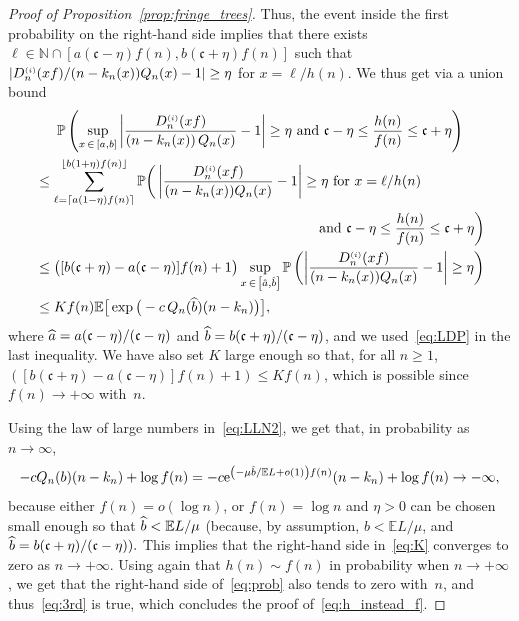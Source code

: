 \documentclass[10pt]{amsart}
\theoremstyle{definition}\newtheorem{defi}[theo]{Definition}\newtheorem{rema}[theo]{Remark}\newtheorem{exam}[theo]{Example}\newtheorem{exem}[theo]{Example}\newtheorem{nota}[theo]{Notation}
\newcommand{\sss}{\ensuremath{\scriptscriptstyle}}
\newcommand{\bbP}{\mathbb{P}}
\newcommand{\bbE}{\mathbb{E}}
\newcommand{\bbN}{\mathbb{N}}
\newcommand{\rme}{\mathrm{e}}
\newcommand{\frkc}{\mathfrak{c}}
\let\oldhat\hat
\renewcommand*{\hat}[1]{\mathchoice{\widehat{#1}}{\widehat{#1}}{\oldhat{#1}}{\oldhat{#1}}}
\begin{document}
\begin{proof}[Proof of Proposition~\ref{prop:fringe_trees}]
Thus, the event inside the first probability on the right-hand side implies that there exists $\ell\in\bbN\cap[a(\frkc-\eta)f(n), b(\frkc+\eta)f(n)]$ such that $|{D_n^{\sss (i)}(xf)}/{(n-k_n(x))Q_n(x)}-1|\geq \eta$ for $x = \ell/h(n)$. We thus get via a union bound
\begin{multline}\label{eq:K}
\bbP\left(\sup_{x\,\in\,[a,b]}\left|\frac{D_n^{\sss (i)}(xf)}{\left(n-k_n(x)\right)Q_n(x)}-1\right|\geq\eta
\text{ and } \frkc-\eta \leq \frac{h(n)}{f(n)}\leq \frkc+\eta\right)\\
\begin{aligned}
&\leq \sum_{\ell=\left\lceil a(1-\eta)f(n)\right\rceil}^{\left\lfloor b(1+\eta)f(n)\right\rfloor}
\bbP\bigg(\left|\frac{D_n^{\sss (i)}(xf)}{(n-k_n(x))Q_n(x)}-1\right|\geq\eta
\text{ for } x=\ell/h(n)\\
&\hskip20em\text{ and } \frkc-\eta \leq \frac{h(n)}{f(n)}\leq \frkc+\eta\bigg)\\
&\leq \big([b(\frkc+\eta)-a(\frkc-\eta)]f(n)+1\big)
\sup_{x\,\in\,\left[\hat a, \hat b\right]} \bbP\left(\left|\frac{D_n^{\sss (i)}(xf)}{(n-k_n(x))Q_n(x)}-1\right|\geq \eta\right)\\
&\leq Kf(n)\bbE\big[\exp\big(-c\,Q_n(\hat b)(n-k_n)\big)\big],
\end{aligned}
\end{multline}
where $\hat a = a(\frkc-\eta)/(\frkc-\eta)$ and $\hat b = b(\frkc+\eta)/(\frkc-\eta)$, and we used~\eqref{eq:LDP} in the last inequality. We have also set $K$ large enough so that, for all $n\geq 1$, $([b(\frkc+\eta)-a(\frkc-\eta)]f(n)+1)\leq Kf(n)$, which is possible since $f(n)\to+\infty$ with~$n$.


Using the law of large numbers in~\eqref{eq:LLN2}, we get that, in probability as $n\to\infty$,
\[
-cQ_n(b)(n-k_n)+\log f(n) = -c \rme^{\left(-\mu \hat b/\bbE L+o(1)\right)f(n)}(n-k_n)+\log f(n)
\to -\infty,
\]
because either $f(n)=o(\log n)$, or $f(n) = \log n$ and $\eta>0$ can be chosen small enough so that $\hat b<\bbE L/\mu$ (because, by assumption, $b<\bbE L/\mu$, and $\hat b = b(\frkc+\eta)/(\frkc-\eta)).$ This implies that the right-hand side in~\eqref{eq:K} converges to zero as $n\to+\infty$. Using again that $h(n)\sim f(n)$ in probability when $n\to+\infty$, we get that the right-hand side of~\eqref{eq:prob} also tends to zero with~$n$, and thus~\eqref{eq:3rd} is true, which concludes the proof of~\eqref{eq:h_instead_f}.


\end{proof}
\end{document}
